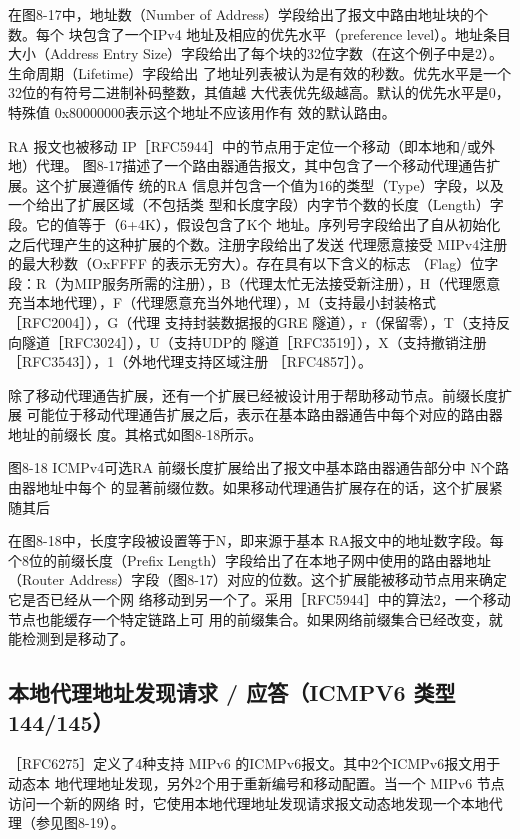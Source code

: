 在图8-17中，地址数（Number of Address）学段给出了报文中路由地址块的个数。每个
块包含了一个IPv4 地址及相应的优先水平（preference level）。地址条目大小（Address Entry
Size）字段给出了每个块的32位字数（在这个例子中是2）。生命周期（Lifetime）字段给出
了地址列表被认为是有效的秒数。优先水平是一个32位的有符号二进制补码整数，其值越
大代表优先级越高。默认的优先水平是0，特殊值 0x80000000表示这个地址不应该用作有
效的默认路由。

RA 报文也被移动 IP［RFC5944］中的节点用于定位一个移动（即本地和/或外地）代理。
图8-17描述了一个路由器通告报文，其中包含了一个移动代理通告扩展。这个扩展遵循传
统的RA 信息并包含一个值为16的类型（Type）字段，以及一个给出了扩展区域（不包括类
型和长度字段）内字节个数的长度（Length）字段。它的值等于（6+4K），假设包含了K个
地址。序列号字段给出了自从初始化之后代理产生的这种扩展的个数。注册字段给出了发送
代理愿意接受 MIPv4注册的最大秒数（OxFFFF 的表示无穷大）。存在具有以下含义的标志
（Flag）位字段：R（为MIP服务所需的注册），B（代理太忙无法接受新注册），H（代理愿意
充当本地代理），F（代理愿意充当外地代理），M（支持最小封装格式［RFC2004］），G（代理
支持封装数据报的GRE 隧道），r（保留零），T（支持反向隧道［RFC3024］），U（支持UDP的
隧道［RFC3519］），X（支持撤销注册［RFC3543］），1（外地代理支持区域注册 ［RFC4857］）。

除了移动代理通告扩展，还有一个扩展已经被设计用于帮助移动节点。前缀长度扩展
可能位于移动代理通告扩展之后，表示在基本路由器通告中每个对应的路由器地址的前缀长
度。其格式如图8-18所示。

图8-18 ICMPv4可选RA 前缀长度扩展给出了报文中基本路由器通告部分中 N个路由器地址中每个
的显著前缀位数。如果移动代理通告扩展存在的话，这个扩展紧随其后

在图8-18中，长度字段被设置等于N，即来源于基本 RA报文中的地址数字段。每
个8位的前缀长度（Prefix Length）字段给出了在本地子网中使用的路由器地址（Router
Address）字段（图8-17）对应的位数。这个扩展能被移动节点用来确定它是否已经从一个网
络移动到另一个了。采用［RFC5944］中的算法2，一个移动节点也能缓存一个特定链路上可
用的前缀集合。如果网络前缀集合已经改变，就能检测到是移动了。

\subsection{本地代理地址发现请求 / 应答（ICMPV6 类型 144/145）}
［RFC6275］定义了4种支持 MIPv6 的ICMPv6报文。其中2个ICMPv6报文用于动态本
地代理地址发现，另外2个用于重新编号和移动配置。当一个 MIPv6 节点访问一个新的网络
时，它使用本地代理地址发现请求报文动态地发现一个本地代理（参见图8-19）。

